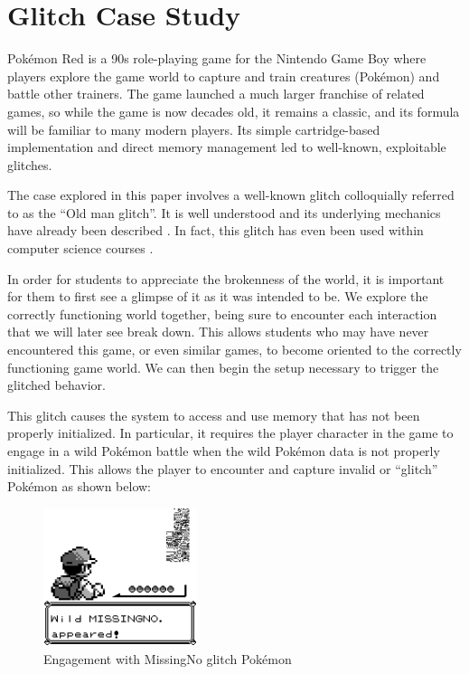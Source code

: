 \documentclass[letterpaper]{article}
\begin{document}
\section{Glitch Case Study}
Pokémon Red is a 90s role-playing game for the Nintendo Game Boy where players explore the game world to capture and train creatures (Pokémon) and battle other trainers. The game launched a much larger franchise of related games, so while the game is now decades old, it remains a classic, and its formula will be familiar to many modern players. Its simple cartridge-based implementation and direct memory management led to well-known, exploitable glitches.

The case explored in this paper involves a well-known glitch colloquially referred to as the ``Old man glitch''. It is well understood and its underlying mechanics have already been described \cite{bulbapedia2005} \cite{scrumpy2016missing}. In fact, this glitch has even been used within computer science courses \cite{rjwalls2022}.

In order for students to appreciate the brokenness of the world, it is important for them to first see a glimpse of it as it was intended to be. We explore the correctly functioning world together, being sure to encounter each interaction that we will later see break down. This allows students who may have never encountered this game, or even similar games, to become oriented to the correctly functioning game world. We can then begin the setup necessary to trigger the glitched behavior.

This glitch causes the system to access and use memory that has not been properly initialized. In particular, it requires the player character in the game to engage in a wild Pokémon battle when the wild Pokémon data is not properly initialized. This allows the player to encounter and capture invalid or ``glitch'' Pokémon as shown below:

\begin{figure}[h!]
    \centering
    \includegraphics[width=0.4\textwidth]{missingno.png}
    \caption{Engagement with MissingNo glitch Pokémon}
\end{figure}
\end{document}
